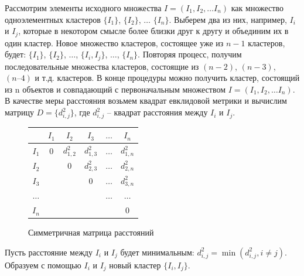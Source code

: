 \documentclass[a4paper,14pt,openany,final]{extreport} %
\begin{document}
{Рассмотрим элементы исходного множества $Ι = (Ι_1, Ι_2, \ldots Ι_n)$ как множество одноэлементных кластеров $\{Ι_1\}$, $\{Ι_2\}$, $\ldots$ $\{Ι_n\}$. Выберем два из них, например, $Ι_i$ и $Ι_j$, которые в некотором смысле более близки друг к другу и объединим их в один кластер. Новое множество кластеров, состоящее уже из $n-1$ кластеров, будет: $\{Ι_1\}$, $\{Ι_2\}$, $\ldots$, $\{Ι_i , Ι_j\}$, $\ldots$, $\{Ι_n\}$. Повторяя процесс, получим последовательные множества кластеров, состоящие из $(n-2)$, $(n-3)$, $(n–4)$ и т.д. кластеров. В конце процедуры можно получить кластер, состоящий из n объектов и совпадающий с первоначальным множеством $Ι = (Ι_1, Ι_2, \ldots Ι_n)$. В качестве меры расстояния возьмем квадрат евклидовой метрики и вычислим матрицу $D= \{d_{i,j}^2 \}$, где $d_{i,j}^2$ -- квадрат расстояния между $Ι_i$ и $Ι_j$.

\begin{figure}[htbp]
  \centering
  \begin{tabular}{|c||c|c|c|c|c|}
    \hline
          & $I_1$ & $I_2$       & $I_3$       & $\ldots$ & $I_n$        \\
    \hline
    \hline
    $I_1$ & 0     & $d_{1,2}^2$ & $d_{1,3}^2$ & $\ldots$ & $d_{1,n}^2$  \\
    \hline
    $I_2$ &       & 0           & $d_{2,3}^2$ & $\ldots$ & $d_{2,n}^2$  \\
    \hline
    $I_3$ &       &             & 0           & $\ldots$ & $d_{3,n}^2$  \\
    \hline
 $\ldots$ &       &             &             & $\ldots$ & $\ldots$ \\
    \hline
    $I_n$ &       &             &             &          & 0  \\
    \hline
  \end{tabular}
  \caption{Симметричная матрица расстояний}
  \label{fig:disssimm}
\end{figure}
Пусть расстояние между $Ι_i$ и $Ι_j$ будет минимальным: $d_{i,j}^2=\min⁡(d_{i,j}^2,i\neq j)$. Образуем с помощью $Ι_i$ и $Ι_j$ новый кластер $\{Ι_i, Ι_j\}.$

}
\end{document}
